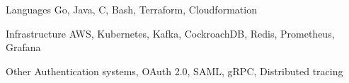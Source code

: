 

\begin{cvskills}

  \cvskill
    {Languages} %
    {Go, Java, C, Bash, Terraform, Cloudformation} %

  \cvskill
    {Infrastructure} %
    {AWS, Kubernetes, Kafka, CockroachDB, Redis, Prometheus, Grafana} %

  \cvskill
  {Other} %
  {Authentication systems, OAuth 2.0, SAML, gRPC, Distributed tracing} %


\end{cvskills}
